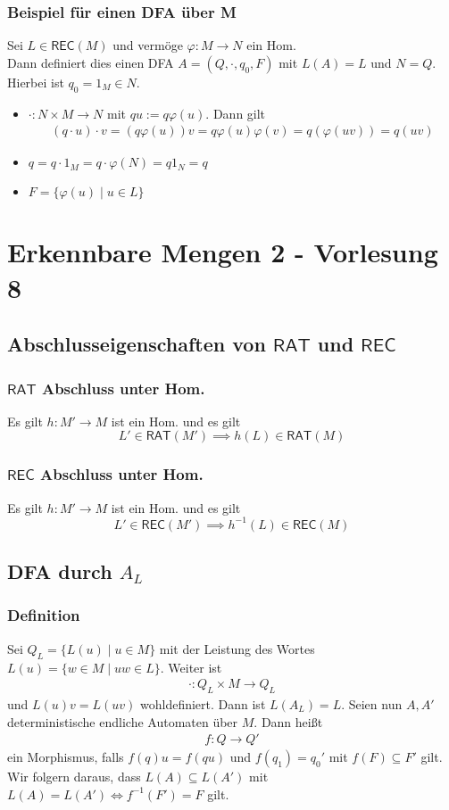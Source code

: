 \documentclass[12pt, german]{article}
\newcommand{\inv}{^{-1}}
\newcommand{\rat}{\mathsf{RAT}}
\newcommand{\rec}{\mathsf{REC}}
\begin{document}
\subsubsection{Beispiel für einen DFA über M}
	Sei $L \in \rec(M)$ und vermöge $\varphi: M \to N$ ein Hom. \\ 
	Dann definiert dies einen DFA $A = (Q,\cdot, q_0, F)$ mit $L(A) = L$ und $N = Q$. 
	Hierbei ist $q_0 = 1_M \in N$. 
	\begin{itemize}
	\item $\cdot : N \times M \to N$ mit $qu := q\varphi(u)$. Dann gilt
	\begin{align*}
		(q \cdot u)\cdot v = (q\varphi(u))v = q \varphi(u)\varphi(v) = q(\varphi(uv)) = q(uv)
	\end{align*}
	\item $q = q \cdot 1_M = q \cdot \varphi(N) = q1_N = q$
	\item $F = \{\varphi(u) \mid u \in L \}$
\end{itemize}

\section{Erkennbare Mengen 2 - Vorlesung 8}
\subsection{Abschlusseigenschaften von $\rat$ und $\rec$}
\subsubsection{$\rat$ Abschluss unter Hom.}
	Es gilt $h: M' \to M$ ist ein Hom. und es gilt $$L' \in \rat(M') \implies h(L) \in \rat(M)$$

\subsubsection{$\rec$ Abschluss unter Hom.}
	Es gilt $h: M' \to M$ ist ein Hom. und es gilt $$L' \in \rec(M') \implies h\inv(L) \in \rec(M)$$

\subsection{DFA durch $A_L$}
\subsubsection{Definition}
	Sei $Q_L = \{L(u) \mid u \in M\}$ mit der Leistung des Wortes $L(u) = \{ w \in M \mid uw \in L\}$. Weiter ist 
	\begin{align*}
		\cdot: Q_L \times M  \to Q_L
	\end{align*}
	und $L(u)v = L(uv)$ wohldefiniert. Dann ist $L(A_L) = L$. 
	Seien nun $A, A'$ deterministische endliche Automaten über $M$. Dann heißt 
	\begin{align*}
		f: Q \to Q'
	\end{align*} ein Morphismus, falls $f(q)u=f(qu)$ und $f(q_1) = q_0'$ mit $f(F) \subseteq F'$ gilt.
	Wir folgern daraus, dass $L(A) \subseteq L(A')$ mit $L(A) = L(A') \iff f\inv(F') = F$ gilt. 
\end{document}
